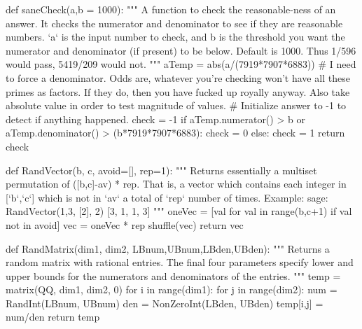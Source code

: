 \begin{sagesilent}
def saneCheck(a,b = 1000):
    """ A function to check the reasonable-ness of an answer. It checks the 
        numerator and denominator to see if they are reasonable numbers. `a` is 
        the input number to check, and b is the threshold you want the numerator
        and denominator (if present) to be below. Default is 1000. Thus 1/596
        would pass, 5419/209 would not.
    """
    aTemp = abs(a/(7919*7907*6883)) # I need to force a denominator. Odds are, whatever you're checking won't have all these primes as factors. If they do, then you have fucked up royally anyway. Also take absolute value in order to test magnitude of values.
    # Initialize answer to -1 to detect if anything happened.
    check = -1
    if aTemp.numerator() > b or aTemp.denominator() > (b*7919*7907*6883):
        check = 0
    else:
        check = 1
    return check

def RandVector(b, c, avoid=[], rep=1):
    """ Returns essentially a multiset permutation of ([b,c]-av) * rep.
        That is, a vector which contains each integer in [`b`,`c`] which is not in `av` a total of `rep` number of times.
        Example:
        sage: RandVector(1,3, [2], 2)
        [3, 1, 1, 3]
    """
    oneVec = [val for val in range(b,c+1) if val not in avoid]
    vec = oneVec * rep
    shuffle(vec)
    return vec

def RandMatrix(dim1, dim2, LBnum,UBnum,LBden,UBden):
    """ Returns a random matrix with rational entries. 
        The final four parameters specify lower and upper bounds for the 
        numerators and denominators of the entries.
    """
    temp = matrix(QQ, dim1, dim2, 0)
    for i in range(dim1):
        for j in range(dim2):
            num = RandInt(LBnum, UBnum)
            den = NonZeroInt(LBden, UBden)
            temp[i,j] = num/den
    return temp

\end{sagesilent}